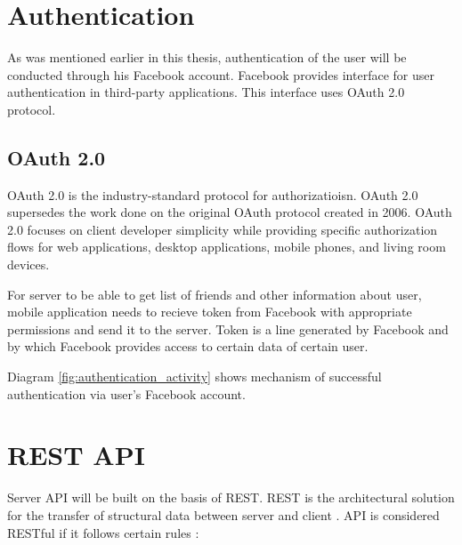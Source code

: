 \section{Authentication}
As was mentioned earlier in this thesis, authentication of the user will be conducted through his Facebook account.
Facebook provides interface for user authentication in third-party applications. This interface uses OAuth 2.0 protocol.

\subsection{OAuth 2.0}
OAuth 2.0 is the industry-standard protocol for authorizatioisn. OAuth 2.0 supersedes the work done on the original OAuth
protocol created in 2006. OAuth 2.0 focuses on client developer simplicity while providing specific authorization flows
for web applications, desktop applications, mobile phones, and living room devices. \cite{oauth}

For server to be able to get list of friends and other information about user, mobile application needs to recieve
token from Facebook with appropriate permissions and send it to the server. Token is a line generated by Facebook and
by which Facebook provides access to certain data of certain user.

Diagram \ref{fig:authentication_activity} shows mechanism of successful authentication via user's Facebook account.


\newcommand{\ritem}[1]{
    \item \textbf{#1} \par
}
\section{REST API}

Server API will be built on the basis of \ac{REST}. \ac{REST} is the architectural solution for the transfer of
structural data between server and client \cite{rest}.
API is considered RESTful if it follows certain rules \cite{whatisrest}:


